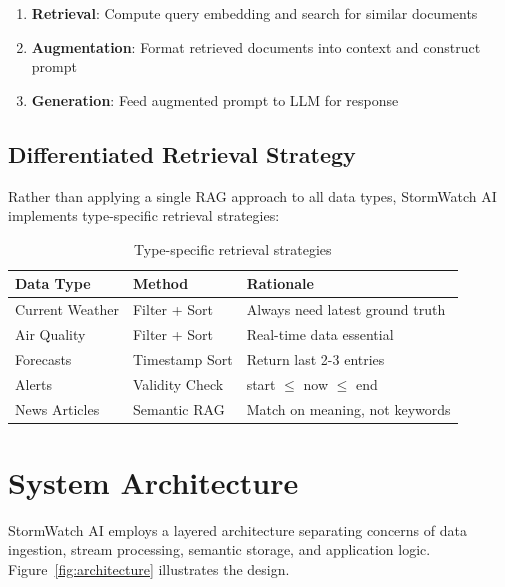 \documentclass[11pt,a4paper]{article}
\begin{document}
\begin{enumerate}[leftmargin=2em, itemsep=0.2em]
    \item \textbf{Retrieval}: Compute query embedding and search for similar documents
    \item \textbf{Augmentation}: Format retrieved documents into context and construct prompt
    \item \textbf{Generation}: Feed augmented prompt to LLM for response
\end{enumerate}

\subsection{Differentiated Retrieval Strategy}

Rather than applying a single RAG approach to all data types, StormWatch AI implements type-specific retrieval strategies:

\begin{table}[H]
\centering
\caption{Type-specific retrieval strategies}
\renewcommand{\arraystretch}{1.3}
\begin{tabular}{l l p{5.5cm}}
\toprule
\textbf{Data Type} & \textbf{Method} & \textbf{Rationale} \\
\midrule
Current Weather & Filter + Sort & Always need latest ground truth \\
Air Quality & Filter + Sort & Real-time data essential \\
Forecasts & Timestamp Sort & Return last 2-3 entries \\
Alerts & Validity Check & start $\leq$ now $\leq$ end \\
News Articles & Semantic RAG & Match on meaning, not keywords \\
\bottomrule
\end{tabular}
\end{table}

\newpage
\section{System Architecture}

StormWatch AI employs a layered architecture separating concerns of data ingestion, stream processing, semantic storage, and application logic. Figure~\ref{fig:architecture} illustrates the design.
\end{document}
